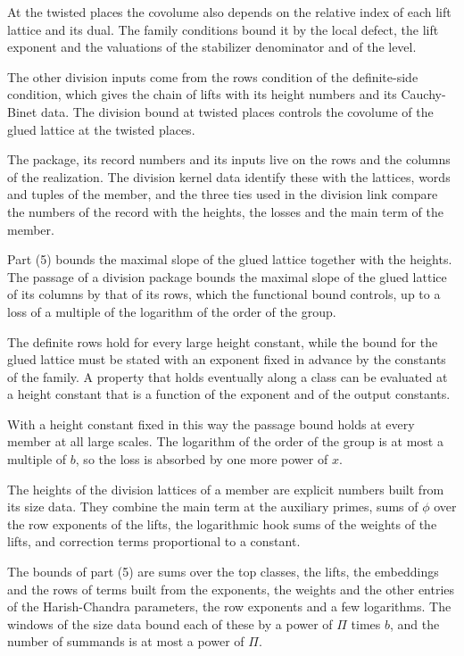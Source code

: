At the twisted places the covolume also depends on the relative index of each
lift lattice and its dual. The family conditions bound it by the local defect,
the lift exponent and the valuations of the stabilizer denominator and of the
level.

The other division inputs come from the rows condition of the definite-side
condition, which gives the chain of lifts with its height numbers and its
Cauchy-Binet data. The division bound at twisted places controls the
covolume of the glued lattice at the twisted places.

The package, its record numbers and its inputs live on the rows and the
columns of the realization. The division kernel data identify these with the
lattices, words and tuples of the member, and the three ties used in the
division link compare the numbers of the record with the heights, the losses
and the main term of the member.

Part (5) bounds the maximal slope of the glued lattice together with the
heights. The passage of a division package bounds the maximal slope of the
glued lattice of its columns by that of its rows, which the functional bound
controls, up to a loss of a multiple of the logarithm of the order of the
group.

The definite rows hold for every large height constant, while the bound for
the glued lattice must be stated with an exponent fixed in advance by the
constants of the family. A property that holds eventually along a class can
be evaluated at a height constant that is a function of the exponent and of
the output constants.

With a height constant fixed in this way the passage bound holds at every
member at all large scales. The logarithm of the order of the group is at
most a multiple of $b$, so the loss is absorbed by one more power of $x$.

The heights of the division lattices of a member are explicit numbers built
from its size data. They combine the main term at the auxiliary primes, sums
of $\phi$ over the row exponents of the lifts, the logarithmic hook sums of
the weights of the lifts, and correction terms proportional to a constant.

The bounds of part (5) are sums over the top classes, the lifts, the
embeddings and the rows of terms built from the exponents, the weights and the
other entries of the Harish-Chandra parameters, the row exponents and a few
logarithms. The windows of the size data bound each of these by a power of
$\Pi$ times $b$, and the number of summands is at most a power of $\Pi$.

